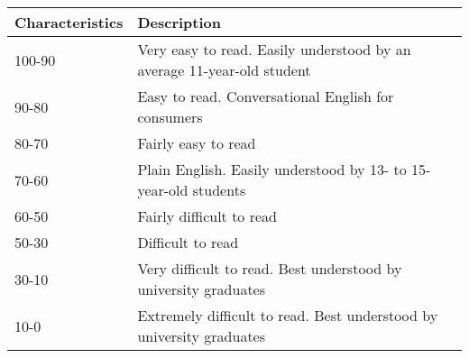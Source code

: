 \begin{tabular}{|l|l|} \hline
\textbf{Characteristics} & \textbf{Description} \\ \hline
100-90 & Very easy to read. Easily understood by an average 11-year-old student \\ \hline
90-80 & Easy to read. Conversational English for consumers \\ \hline
80-70 & Fairly easy to read \\ \hline
70-60 & Plain English. Easily understood by 13- to 15-year-old students \\ \hline
60-50 & Fairly difficult to read \\ \hline
50-30 & Difficult to read \\ \hline
30-10 & Very difficult to read. Best understood by university graduates \\ \hline
10-0 & Extremely difficult to read. Best understood by university graduates \\ \hline
\end{tabular}